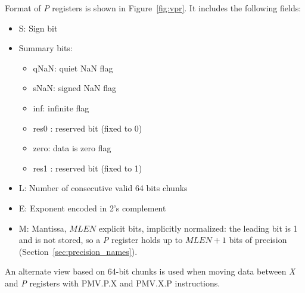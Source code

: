 Format of {\em P} registers is shown in Figure~\ref{fig:vpr}.
It includes the following fields:
\begin{itemize}[topsep=0pt]
    \item S: Sign bit
    \item Summary bits:
    \begin{itemize}[topsep=0pt]
        \item qNaN: quiet NaN flag
        \item sNaN: signed NaN flag
        \item inf: infinite flag
        \item res0 : reserved bit (fixed to 0)
        \item zero: data is zero flag
        \item res1 : reserved bit (fixed to 1)
    \end{itemize}
    \item L: Number of consecutive valid 64 bits chunks
    \item E: Exponent encoded in 2's complement
    \item M: Mantissa, $MLEN$ explicit bits, implicitly normalized: the leading bit is 1 and is not stored, so a {\em P} register holds up to $MLEN + 1$ bits of precision (Section~\ref{sec:precision_names}).
\end{itemize}

An alternate view based on 64-bit chunks is used when moving data between {\em X} and {\em P} registers with PMV.P.X and PMV.X.P instructions.

